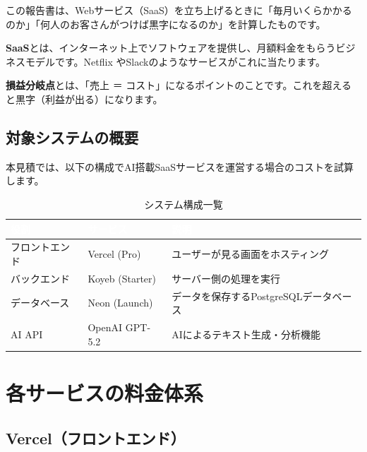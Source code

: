 \documentclass[a4paper,11pt]{ltjsarticle}
\begin{document}
\begin{infobox}[初心者の方へ]
この報告書は、Webサービス（SaaS）を立ち上げるときに「毎月いくらかかるのか」「何人のお客さんがつけば黒字になるのか」を計算したものです。

\textbf{SaaS}とは、インターネット上でソフトウェアを提供し、月額料金をもらうビジネスモデルです。Netflix やSlackのようなサービスがこれに当たります。

\textbf{損益分岐点}とは、「売上 ＝ コスト」になるポイントのことです。これを超えると黒字（利益が出る）になります。
\end{infobox}

\subsection{対象システムの概要}

本見積では、以下の構成でAI搭載SaaSサービスを運営する場合のコストを試算します。

\begin{table}[H]
\centering
\caption{システム構成一覧}
\begin{tabular}{llp{7cm}}
\toprule
\rowcolor{headerblue}\textcolor{white}{\textbf{役割}} & \textcolor{white}{\textbf{サービス}} & \textcolor{white}{\textbf{説明}} \\
\midrule
フロントエンド & Vercel (Pro) & ユーザーが見る画面をホスティング \\
\rowcolor{lightgray}
バックエンド & Koyeb (Starter) & サーバー側の処理を実行 \\
データベース & Neon (Launch) & データを保存するPostgreSQLデータベース \\
\rowcolor{lightgray}
AI API & OpenAI GPT-5.2 & AIによるテキスト生成・分析機能 \\
\bottomrule
\end{tabular}
\end{table}


\section{各サービスの料金体系}

\subsection{Vercel（フロントエンド）}
\end{document}
